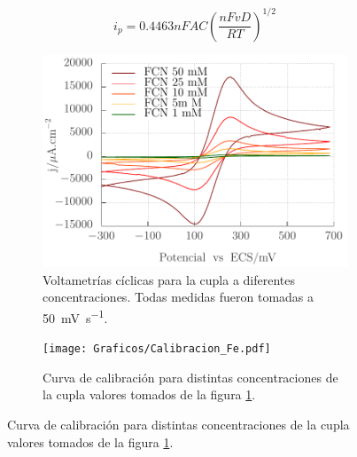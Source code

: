 		 	\begin{equation}
			i_p=0.4463nFAC\left(\frac{nFvD}{RT}\right)^{1/2}
			\label{eq:rs2}
			\end{equation}

			\begin{figure}[ht]
	 	    	\begin{subfigure}[t]{0.5\textwidth}
	         	\includegraphics[width=\textwidth]{Graficos/Concentraciones_Fe.pdf}
	        	\caption{Voltametrías cíclicas para la cupla \fe\space a diferentes concentraciones. Todas medidas fueron tomadas a \SI{50}{\milli\volt\per\second}.}
	         	\label{fig:Fe_a}
	     		\end{subfigure}
     		 \begin{subfigure}[t]{0.495\textwidth}
	        	\texttt{[image: Graficos/Calibracion\_Fe.pdf]}
	       		\caption{Curva de calibración para distintas concentraciones de la cupla \fe\space valores tomados de la figura \ref{fig:Fe_a}.}
	         	\label{fig:Fe_b}
	     		\end{subfigure}


\end{figure}

